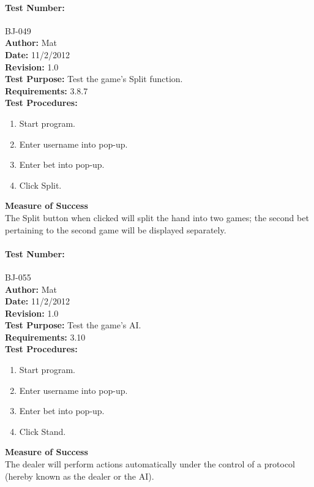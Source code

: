 \documentclass{article}
\begin{document}
\paragraph{Test Number:} BJ-049\\
\textbf{Author:} Mat\\
\textbf{Date:} 11/2/2012\\
\textbf{Revision:} 1.0\\
\textbf{Test Purpose:} Test the game's Split function.\\
\textbf{Requirements:} 3.8.7 \\
\textbf{Test Procedures:} 
\begin{enumerate}
\item Start program.
\item Enter username into pop-up.
\item Enter bet into pop-up.
\item Click Split.
\end{enumerate}
\textbf{Measure of Success}\\The Split button when clicked will split the hand into two games; the second bet pertaining to the second game will be displayed separately.
\paragraph{Test Number:} BJ-055\\
\textbf{Author:} Mat\\
\textbf{Date:} 11/2/2012\\
\textbf{Revision:} 1.0\\
\textbf{Test Purpose:} Test the game's AI. \\
\textbf{Requirements:} 3.10 \\
\textbf{Test Procedures:} 
\begin{enumerate}
\item Start program.
\item Enter username into pop-up.
\item Enter bet into pop-up.
\item Click Stand.
\end{enumerate}
\textbf{Measure of Success}\\The dealer will perform actions automatically under the control of a protocol (hereby known as the dealer or the AI).
\end{document}
